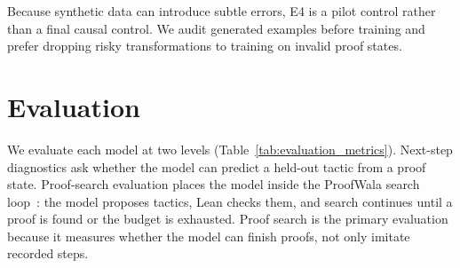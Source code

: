 \documentclass{article} %
\begin{document}
Because synthetic data can introduce subtle errors, E4 is a pilot control rather
than a final causal control.  We audit generated examples before training and
prefer dropping risky transformations to training on invalid proof states.

\section{Evaluation}
\label{sec:evaluation}

We evaluate each model at two levels (Table~\ref{tab:evaluation_metrics}).
Next-step diagnostics ask whether the model can predict a held-out tactic from
a proof state.  Proof-search evaluation places the model inside the ProofWala
search loop~\citep{thakur2025proofwala}: the model proposes tactics, Lean checks
them, and search continues until a proof is found or the budget is exhausted.
Proof search is the primary evaluation because it measures whether the model can
finish proofs, not only imitate recorded steps.
\end{document}
